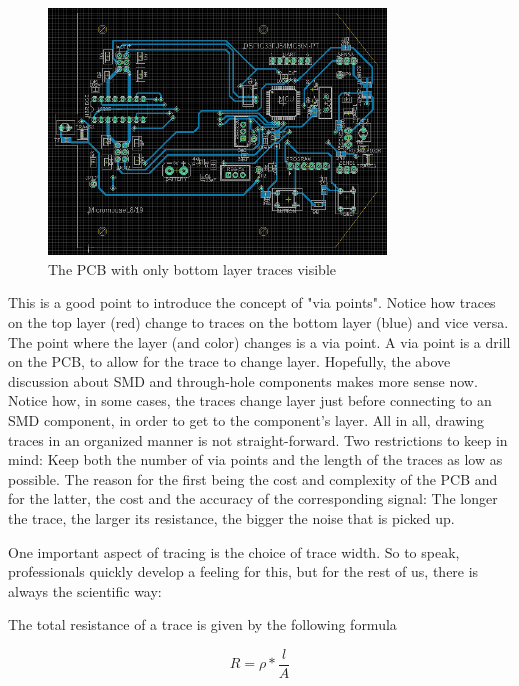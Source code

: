 \begin{figure}[htb]
    \centering
    \includegraphics[width=0.8\textwidth]{figures/hardware/PCB_Bottom.PNG}
    \caption{The PCB with only bottom layer traces visible}
    \label{fig:bottom}
\end{figure}

\FloatBarrier

This is a good point to introduce the concept of "via points". Notice how traces on the top layer (red) change to traces on the bottom layer (blue) and vice versa. The point where the layer (and color) changes is a via point. A via point is a drill on the PCB, to allow for the trace to change layer. 
Hopefully, the above discussion about SMD and through-hole components makes more sense now. Notice how, in some cases, the traces change layer just before connecting to an SMD component, in order to get to the component's layer.
All in all, drawing traces in an organized manner is not straight-forward. Two restrictions to keep in mind: Keep both the number of via points and the length of the traces as low as possible. The reason for the first being the cost and complexity of the PCB and for the latter, the cost and the accuracy of the corresponding signal: The longer the trace, the larger its resistance, the bigger the noise that is picked up.

One important aspect of tracing is the choice of trace width. So to speak, professionals quickly develop a feeling for this, but for the rest of us, there is always the scientific way:

The total resistance of a trace is given by the following formula

$$R = \rho * \frac{l}{A}$$

